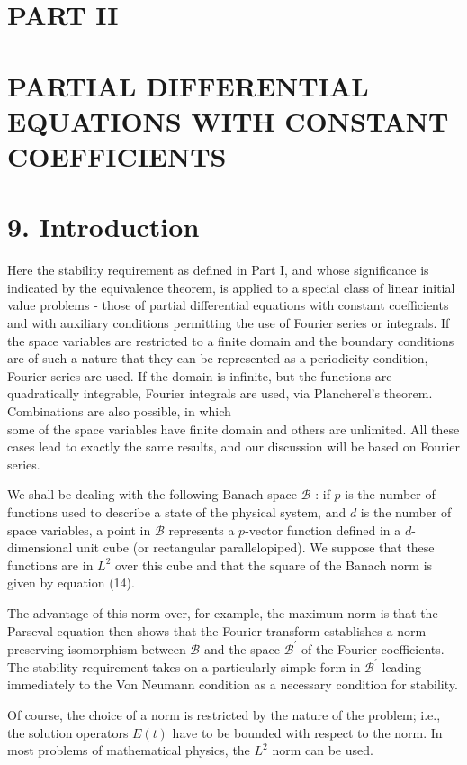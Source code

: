 \documentclass[10pt]{article}
\begin{document}
\section*{PART II}
\section*{PARTIAL DIFFERENTIAL EQUATIONS WITH CONSTANT COEFFICIENTS}
\section*{9. Introduction}
Here the stability requirement as defined in Part I, and whose significance is indicated by the equivalence theorem, is applied to a special class of linear initial value problems - those of partial differential equations with constant coefficients and with auxiliary conditions permitting the use of Fourier series or integrals. If the space variables are restricted to a finite domain and the boundary conditions are of such a nature that they can be represented as a periodicity condition, Fourier series are used. If the domain is infinite, but the functions are quadratically integrable, Fourier integrals are used, via Plancherel's theorem. Combinations are also possible, in which\\
some of the space variables have finite domain and others are unlimited. All these cases lead to exactly the same results, and our discussion will be based on Fourier series.

We shall be dealing with the following Banach space \(\mathscr{B}\) : if \(p\) is the number of functions used to describe a state of the physical system, and \(d\) is the number of space variables, a point in \(\mathscr{B}\) represents a \(p\)-vector function defined in a \(d\)-dimensional unit cube (or rectangular parallelopiped). We suppose that these functions are in \(L^{2}\) over this cube and that the square of the Banach norm is given by equation (14).

The advantage of this norm over, for example, the maximum norm is that the Parseval equation then shows that the Fourier transform establishes a norm-preserving isomorphism between \(\mathscr{B}\) and the space \(\mathscr{B}^{\prime}\) of the Fourier coefficients. The stability requirement takes on a particularly simple form in \(\mathscr{B}^{\prime}\) leading immediately to the Von Neumann condition as a necessary condition for stability.

Of course, the choice of a norm is restricted by the nature of the problem; i.e., the solution operators \(E(t)\) have to be bounded with respect to the norm. In most problems of mathematical physics, the \(L^{2}\) norm can be used.
\end{document}
